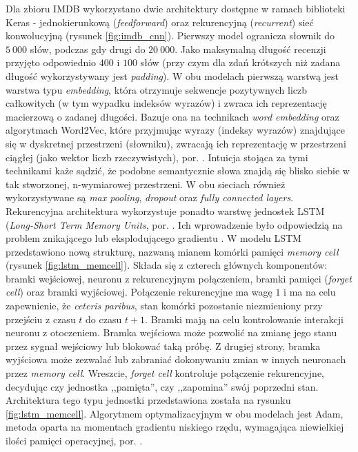 \documentclass[12pt,a4paper,twoside]{article}
\begin{document}
Dla zbioru IMDB wykorzystano dwie architektury dostępne w ramach biblioteki Keras - jednokierunkową (\textit{feedforward}) oraz rekurencyjną (\textit{recurrent}) sieć konwolucyjną (rysunek \ref{fig:imdb_cnn}). Pierwszy model ogranicza słownik do $5~000$ słów, podczas gdy drugi do $20~000$. Jako maksymalną długość recenzji przyjęto odpowiednio $400$ i $100$ słów (przy czym dla zdań krótszych niż zadana długość wykorzystywany jest \textit{padding}). W obu modelach pierwszą warstwą jest warstwa typu \textit{embedding}, która otrzymuje sekwencje pozytywnych liczb całkowitych (w tym wypadku indeksów wyrazów) i zwraca ich reprezentację macierzową o zadanej długości. Bazuje ona na technikach \textit{word embedding} oraz algorytmach Word2Vec, które przyjmując wyrazy (indeksy wyrazów) znajdujące się w dyskretnej przestrzeni (słowniku), zwracają ich reprezentację w przestrzeni ciągłej (jako wektor liczb rzeczywistych), por. \citep{goldberg2014}. Intuicja stojąca za tymi technikami każe sądzić, że podobne semantycznie słowa znajdą się blisko siebie w tak stworzonej, n-wymiarowej przestrzeni.
W obu sieciach również wykorzystywane są \textit{max pooling}, \textit{dropout} oraz \textit{fully connected layers}. Rekurencyjna architektura wykorzystuje ponadto warstwę jednostek LSTM (\textit{Long-Short Term Memory Units}, por. \citet{hochreiter1997}. Ich wprowadzenie było odpowiedzią na problem znikającego lub eksplodującego gradientu \citep{hochreiter1991}. W modelu LSTM przedstawiono nową strukturę, nazwaną mianem komórki pamięci \textit{memory cell} (rysunek \ref{fig:lstm_memcell}). Składa się z czterech głównych komponentów: bramki wejściowej, neuronu z rekurencyjnym połączeniem, bramki pamięci (\textit{forget cell}) oraz bramki wyjściowej.
Połączenie rekurencyjne ma wagę $1$ i ma na celu zapewnienie, że \textit{ceteris paribus}, stan komórki pozostanie niezmieniony przy przejściu z czasu $t$ do czasu $t+1$. Bramki mają na celu kontrolowanie interakcji neuronu z otoczeniem. Bramka wejściowa może pozwolić na zmianę jego stanu przez sygnał wejściowy lub blokować taką próbę. Z drugiej strony, bramka wyjściowa może zezwalać lub zabraniać dokonywaniu zmian w innych neuronach przez \textit{memory cell}. Wreszcie, \textit{forget cell} kontroluje połączenie rekurencyjne, decydując czy jednostka ,,pamięta'', czy ,,zapomina'' swój poprzedni stan. Architektura tego typu jednostki przedstawiona została na rysunku \ref{fig:lstm_memcell}. Algorytmem optymalizacyjnym w obu modelach jest Adam, metoda oparta na momentach gradientu niskiego rzędu, wymagająca niewielkiej ilości pamięci operacyjnej, por. \citet{kingma2014}.
\end{document}
